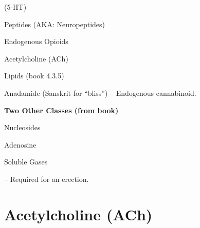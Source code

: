 \begin{coloredlist}
\begin{coloredlist}
        \item {} %
        \begin{coloredlist}
            \item {} (5-HT) %
            \item {} %
        \end{coloredlist}
        \item Peptides (AKA: Neuropeptides)
        \begin{coloredlist}
            \item Endogenous Opioids 
        \end{coloredlist}
        \item Acetylcholine (ACh)
        \item Lipids (book 4.3.5)
        \begin{coloredlist}
            \item Anadamide (Sanskrit for ``bliss'') -- Endogenous cannabinoid.
        \end{coloredlist}
        \item \textbf{Two Other Classes (from book)}
        \begin{coloredlist}
            \item Nucleosides
            \begin{coloredlist}
                \item Adenosine
            \end{coloredlist}
            \item Soluble Gases
            \begin{coloredlist}
                \item {} -- Required for an erection.
            \end{coloredlist}
        \end{coloredlist}
    \end{coloredlist}
\end{coloredlist}

\section{Acetylcholine (ACh)}

